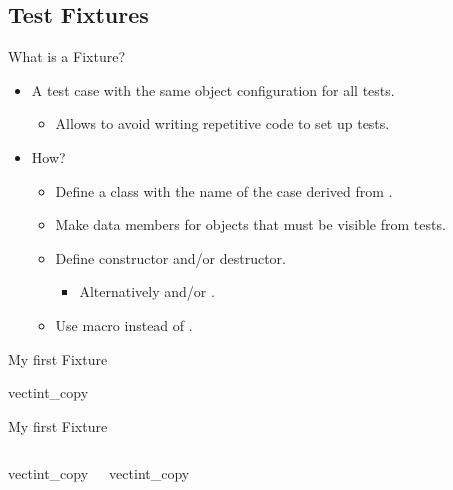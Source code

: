 \subsection{Test Fixtures}

\begin{frame}[t]{What is a Fixture?}
\begin{itemize}
  \item A test case with the same object configuration for all tests.
    \begin{itemize}
      \item Allows to avoid writing repetitive code to set up tests.
    \end{itemize}

  \item How?
    \begin{itemize}
      \item Define a class with the name of the case derived from
            .
      \item Make data members for objects that must be visible from tests.
      \item Define constructor and/or destructor.
        \begin{itemize}
          \item Alternatively  and/or .
        \end{itemize}
      \item Use macro  instead of .
    \end{itemize}
\end{itemize}
\end{frame}

\begin{frame}[t]{My first Fixture}
\begin{block}{vectint\_copy}

\end{block}
\end{frame}

\begin{frame}[t]{My first Fixture}
\begin{columns}

\begin{block}{vectint\_copy}

\end{block}

\begin{block}{vectint\_copy}

\end{block}

\end{columns}
\end{frame}
